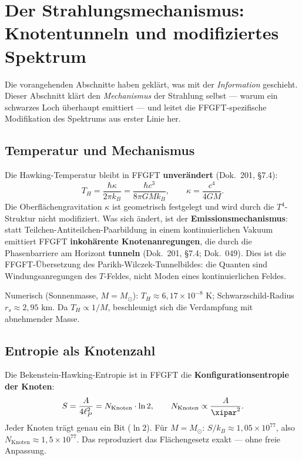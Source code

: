 \section{Der Strahlungsmechanismus: Knotentunneln und modifiziertes Spektrum}

Die vorangehenden Abschnitte haben geklärt, was mit der \emph{Information} geschieht. Dieser Abschnitt klärt den \emph{Mechanismus} der Strahlung selbst --- warum ein schwarzes Loch überhaupt emittiert --- und leitet die FFGFT-spezifische Modifikation des Spektrums aus erster Linie her.

\subsection{Temperatur und Mechanismus}

Die Hawking-Temperatur bleibt in FFGFT \textbf{unverändert} (Dok.~201, §7.4):
\begin{equation}
  T_H = \frac{\hbar \kappa}{2\pi k_B} = \frac{\hbar c^3}{8\pi G M k_B},
  \qquad \kappa = \frac{c^4}{4GM}.
\end{equation}
Die Oberflächengravitation $\kappa$ ist geometrisch festgelegt und wird durch die $T^4$-Struktur nicht modifiziert. Was sich ändert, ist der \textbf{Emissionsmechanismus}: statt Teilchen-Antiteilchen-Paarbildung in einem kontinuierlichen Vakuum emittiert FFGFT \textbf{inkohärente Knotenanregungen}, die durch die Phasenbarriere am Horizont \textbf{tunneln} (Dok.~201, §7.4; Dok.~049). Dies ist die FFGFT-Übersetzung des Parikh-Wilczek-Tunnelbildes: die Quanten sind Windungsanregungen des $T$-Feldes, nicht Moden eines kontinuierlichen Feldes.

Numerisch (Sonnenmasse, $M = M_\odot$): $T_H \approx 6{,}17 \times 10^{-8}$ K; Schwarzschild-Radius $r_s \approx 2{,}95$ km. Da $T_H \propto 1/M$, beschleunigt sich die Verdampfung mit abnehmender Masse.

\subsection{Entropie als Knotenzahl}

Die Bekenstein-Hawking-Entropie ist in FFGFT die \textbf{Konfigurationsentropie der Knoten}:
\begin{equation}
  S = \frac{A}{4 \ell_P^2} = N_\text{Knoten} \cdot \ln 2,
  \qquad N_\text{Knoten} \propto \frac{A}{\xipar^2}.
\end{equation}
Jeder Knoten trägt genau ein Bit ($\ln 2$). Für $M = M_\odot$: $S/k_B \approx 1{,}05 \times 10^{77}$, also $N_\text{Knoten} \approx 1{,}5 \times 10^{77}$. Das reproduziert das Flächengesetz exakt --- ohne freie Anpassung.

